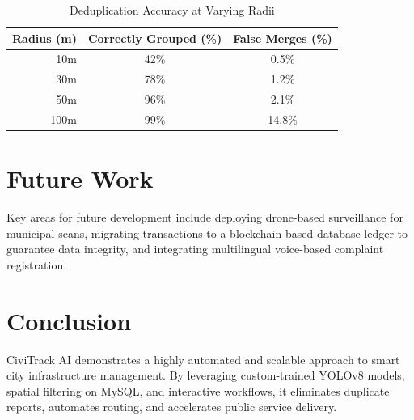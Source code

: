 \documentclass[journal]{IEEEtran}
\begin{document}
\begin{table}[h]
\centering
\caption{Deduplication Accuracy at Varying Radii}
\label{tab:dedup}
\begin{tabular}{rcc}
\toprule
\textbf{Radius (m)} & \textbf{Correctly Grouped (\%)} & \textbf{False Merges (\%)} \\
\midrule
10m & 42\% & 0.5\% \\
30m & 78\% & 1.2\% \\
50m & 96\% & 2.1\% \\
100m & 99\% & 14.8\% \\
\bottomrule
\end{tabular}
\end{table}

\section{Future Work}
Key areas for future development include deploying drone-based surveillance for municipal scans, migrating transactions to a blockchain-based database ledger to guarantee data integrity, and integrating multilingual voice-based complaint registration.

\section{Conclusion}
CiviTrack AI demonstrates a highly automated and scalable approach to smart city infrastructure management. By leveraging custom-trained YOLOv8 models, spatial filtering on MySQL, and interactive workflows, it eliminates duplicate reports, automates routing, and accelerates public service delivery.
\end{document}
